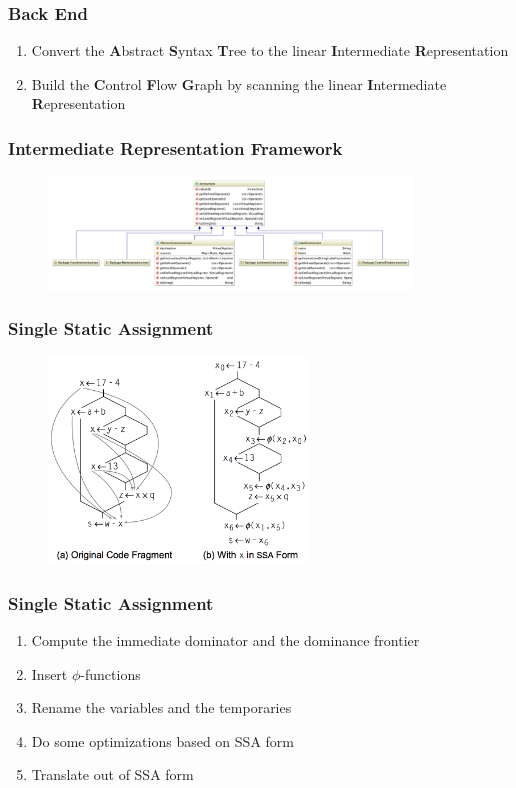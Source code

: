 \documentclass{beamer}
\begin{document}
	\begin{frame}
		\frametitle{Back End}
		\begin{enumerate}
			\item Convert the \textbf{A}bstract \textbf{S}yntax \textbf{T}ree to the linear \textbf{I}ntermediate \textbf{R}epresentation
			\item Build the \textbf{C}ontrol \textbf{F}low \textbf{G}raph by scanning the linear \textbf{I}ntermediate \textbf{R}epresentation
		\end{enumerate}
	\end{frame}

	\begin{frame}
		\frametitle{Intermediate Representation Framework}
		\begin{figure}[!htp]
			\includegraphics[height=3cm]{image/intermediate-representation}
		\end{figure}
	\end{frame}
	
	\begin{frame}
		\frametitle{Single Static Assignment}
		\begin{figure}[!htp]
			\includegraphics[height=5.5cm]{image/single-static-assignment/single-static-assignment}
		\end{figure}
	\end{frame}

	\begin{frame}
		\frametitle{Single Static Assignment}
		\begin{enumerate}
			\item Compute the immediate dominator and the dominance frontier
			\item Insert $\phi$-functions
			\item Rename the variables and the temporaries
			\item Do some optimizations based on SSA form
			\item Translate out of SSA form
		\end{enumerate}
	\end{frame}
	
\end{document}

